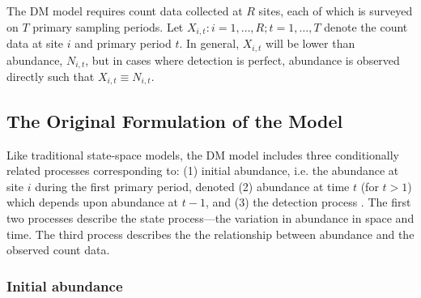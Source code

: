 \documentclass[12pt]{article}
\begin{document}

The DM model requires count data collected at $R$ sites, each of
which is surveyed on $T$ primary sampling periods. 
Let $X_{i,t}: i=1,\hdots,R; t=1,\hdots,T$ denote the count data
at site $i$ and primary period $t$. 
In general, $X_{i,t}$ will be lower than abundance, 
$N_{i,t}$, but in cases where detection is perfect,
abundance is observed directly such that $X_{i,t} \equiv N_{i,t}$.

\subsection{The Original Formulation of the Model}

Like traditional state-space models, the DM model includes 
three conditionally related processes corresponding to: 
(1) initial abundance, i.e. the
abundance at site $i$ during the first primary period,
denoted (2) abundance at time $t$ (for $t>1$) which depends upon
abundance at $t-1$, and (3) the
detection process \citep{dail_madsen:2011}.
The first two processes describe the state process---the
variation in abundance in space and time. The third process %
describes the the relationship between
abundance and the observed count data.

\subsubsection{Initial abundance}
\end{document}
